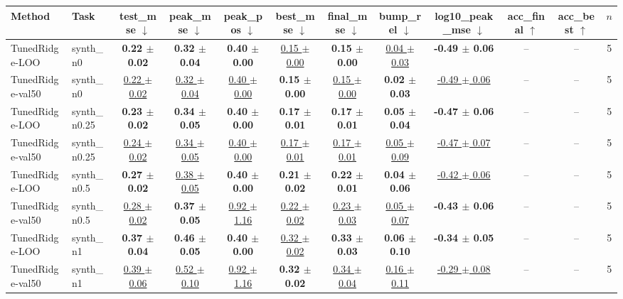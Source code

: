 \begin{tabular}{llcccccccccc}
\toprule
Method & Task & test\_mse $\downarrow$ & peak\_mse $\downarrow$ & peak\_pos $\downarrow$ & best\_mse $\downarrow$ & final\_mse $\downarrow$ & bump\_rel $\downarrow$ & log10\_peak\_mse $\downarrow$ & acc\_final $\uparrow$ & acc\_best $\uparrow$ & $n$ \\
\midrule
TunedRidge-LOO & synth\_n0 & \textbf{0.22 $\pm$ 0.02} & \textbf{0.32 $\pm$ 0.04} & \textbf{0.40 $\pm$ 0.00} & \underline{0.15 $\pm$ 0.00} & \textbf{0.15 $\pm$ 0.00} & \underline{0.04 $\pm$ 0.03} & \textbf{-0.49 $\pm$ 0.06} & -- & -- & 5 \\
TunedRidge-val50 & synth\_n0 & \underline{0.22 $\pm$ 0.02} & \underline{0.32 $\pm$ 0.04} & \underline{0.40 $\pm$ 0.00} & \textbf{0.15 $\pm$ 0.00} & \underline{0.15 $\pm$ 0.00} & \textbf{0.02 $\pm$ 0.03} & \underline{-0.49 $\pm$ 0.06} & -- & -- & 5 \\
\midrule
TunedRidge-LOO & synth\_n0.25 & \textbf{0.23 $\pm$ 0.02} & \textbf{0.34 $\pm$ 0.05} & \textbf{0.40 $\pm$ 0.00} & \textbf{0.17 $\pm$ 0.01} & \textbf{0.17 $\pm$ 0.01} & \textbf{0.05 $\pm$ 0.04} & \textbf{-0.47 $\pm$ 0.06} & -- & -- & 5 \\
TunedRidge-val50 & synth\_n0.25 & \underline{0.24 $\pm$ 0.02} & \underline{0.34 $\pm$ 0.05} & \underline{0.40 $\pm$ 0.00} & \underline{0.17 $\pm$ 0.01} & \underline{0.17 $\pm$ 0.01} & \underline{0.05 $\pm$ 0.09} & \underline{-0.47 $\pm$ 0.07} & -- & -- & 5 \\
\midrule
TunedRidge-LOO & synth\_n0.5 & \textbf{0.27 $\pm$ 0.02} & \underline{0.38 $\pm$ 0.05} & \textbf{0.40 $\pm$ 0.00} & \textbf{0.21 $\pm$ 0.02} & \textbf{0.22 $\pm$ 0.01} & \textbf{0.04 $\pm$ 0.06} & \underline{-0.42 $\pm$ 0.06} & -- & -- & 5 \\
TunedRidge-val50 & synth\_n0.5 & \underline{0.28 $\pm$ 0.02} & \textbf{0.37 $\pm$ 0.05} & \underline{0.92 $\pm$ 1.16} & \underline{0.22 $\pm$ 0.02} & \underline{0.23 $\pm$ 0.03} & \underline{0.05 $\pm$ 0.07} & \textbf{-0.43 $\pm$ 0.06} & -- & -- & 5 \\
\midrule
TunedRidge-LOO & synth\_n1 & \textbf{0.37 $\pm$ 0.04} & \textbf{0.46 $\pm$ 0.05} & \textbf{0.40 $\pm$ 0.00} & \underline{0.32 $\pm$ 0.02} & \textbf{0.33 $\pm$ 0.03} & \textbf{0.06 $\pm$ 0.10} & \textbf{-0.34 $\pm$ 0.05} & -- & -- & 5 \\
TunedRidge-val50 & synth\_n1 & \underline{0.39 $\pm$ 0.06} & \underline{0.52 $\pm$ 0.10} & \underline{0.92 $\pm$ 1.16} & \textbf{0.32 $\pm$ 0.02} & \underline{0.34 $\pm$ 0.04} & \underline{0.16 $\pm$ 0.11} & \underline{-0.29 $\pm$ 0.08} & -- & -- & 5 \\

\end{tabular}
